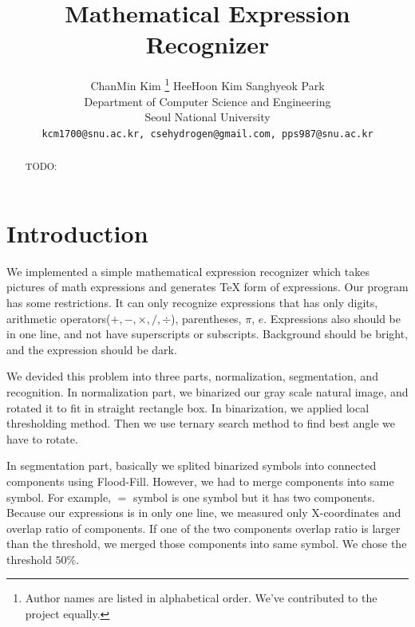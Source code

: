 \documentclass[10pt,twocolumn,letterpaper]{article}
\begin{document}
\title{Mathematical Expression Recognizer}

\author{ChanMin Kim
\thanks{
    Author names are listed in alphabetical order. We've contributed to the project equally.
}
\qquad HeeHoon Kim \qquad Sanghyeok Park\\
Department of Computer Science and Engineering\\
Seoul National University\\
{\tt\small kcm1700@snu.ac.kr, csehydrogen@gmail.com, pps987@snu.ac.kr}
}

\maketitle

\begin{abstract}
	TODO:
\end{abstract}

\section{Introduction}

We implemented a simple mathematical expression recognizer which takes pictures of
math expressions and generates TeX form of expressions. Our program has some restrictions.
It can only recognize expressions that has only digits, arithmetic operators($+, -, \times, /, \div$),
parentheses, $\pi$, $e$. Expressions also should be in one line, and not have
superscripts or subscripts. Background should be bright, and the expression should be dark.

We devided this problem into three parts, normalization, segmentation, and recognition.
In normalization part, we binarized our gray scale natural image, and rotated it to
fit in straight rectangle box. In binarization, we applied local thresholding method.
Then we use ternary search method to find best angle we have to rotate.

In segmentation part, basically we splited binarized symbols into connected components
using Flood-Fill. However, we had to merge components into same symbol. For example,
$=$ symbol is one symbol but it has two components. Because our expressions is in only
one line, we measured only X-coordinates and overlap ratio of components. If one of the
two components overlap ratio is larger than the threshold, we merged those components
into same symbol. We chose the threshold $50\%$.
\end{document}
